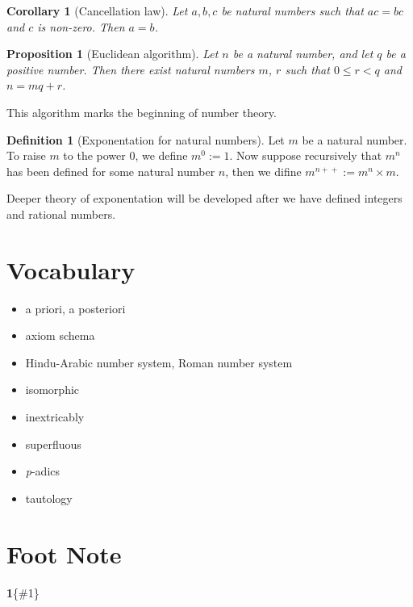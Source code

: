 \documentclass[
]{book}
\providecommand{\tightlist}{%
  \setlength{\itemsep}{0pt}\setlength{\parskip}{0pt}}
\newtheorem{corollary}{Corollary}[chapter]
\newtheorem{proposition}{Proposition}[chapter]
\theoremstyle{definition}
\newtheorem{definition}{Definition}[chapter]
\theoremstyle{definition}
\theoremstyle{definition}
\theoremstyle{definition}
\theoremstyle{remark}
\begin{document}
\begin{corollary}[Cancellation law]
\protect\hypertarget{cor:multican}{}\label{cor:multican}Let \(a,b,c\) be natural numbers such that \(ac=bc\) and \(c\) is non-zero. Then \(a=b\).
\end{corollary}

\begin{proposition}[Euclidean algorithm]
\protect\hypertarget{prp:euclideanalgorithm}{}\label{prp:euclideanalgorithm}Let \(n\) be a natural number, and let \(q\) be a positive number. Then there exist natural numbers \(m\), \(r\) such that \(0\leq r<q\) and \(n=mq+r\).
\end{proposition}

This algorithm marks the beginning of number theory.

\begin{definition}[Exponentation for natural numbers]
\protect\hypertarget{def:exp}{}\label{def:exp}Let \(m\) be a natural number. To raise \(m\) to the power 0, we define \(m^0:=1\). Now suppose recursively that \(m^n\) has been defined for some natural number \(n\), then we difine \(m^{n+\!+}:=m^n\times m\).
\end{definition}

Deeper theory of exponentation will be developed after we have defined integers and rational numbers.

\section{Vocabulary}\label{vocabulary}

\begin{itemize}
\tightlist
\item
  a priori, a posteriori
\item
  axiom schema
\item
  Hindu-Arabic number system, Roman number system
\item
  isomorphic
\item
  inextricably
\item
  superfluous
\item
  \emph{p}-adics
\item
  tautology
\end{itemize}

\section{Foot Note}\label{foot-note}

\textbf{1}\{\#1\}
\end{document}
